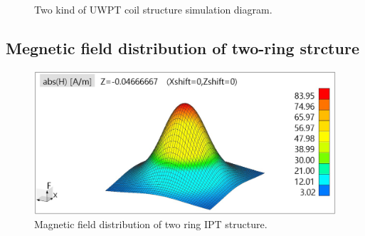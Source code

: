 \begin{figure}[!t]
    \caption{Two kind of UWPT coil structure simulation diagram.}
    \label{fig:3_two_ring_coil}
\end{figure}

\subsection{Megnetic field distribution of two-ring strcture}
\begin{figure}[!t]
    \centering
    \includegraphics[width=0.9\linewidth]{images/4_two_ring_near_field_distribution.JPG}
    \caption{Magnetic field distribution of two ring IPT structure.}
    \label{fig: magnetic distribution of two ring}
\end{figure}

